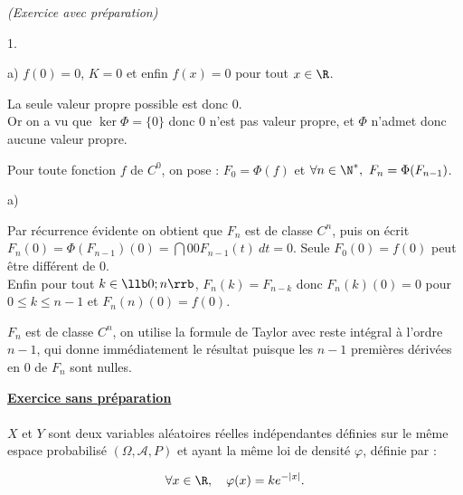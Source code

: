 \documentclass[11pt]{article}%
\begin{document}
\begin{exercice}{\it (Exercice avec préparation)}
\begin{noliste}{1.}
\begin{noliste}{a)}
$f(0) = 0$, $K = 0$ et enfin $f(x) = 0$ pour tout $x \in \R$. \\
 \item La seule valeur propre possible est donc 0. \\
 Or on a vu que $\ker \Phi = \{ 0 \}$ donc $0$ n'est pas valeur propre,
et $\Phi$ n'admet donc aucune valeur propre. \\
 \end{noliste}
 \item Pour toute fonction $f$ de $C^{0}$, on pose : $F_{0} = \Phi(f)$
et $\forall n \in \N^*,\ F_{n} = \Phi ( F_{n-1} )$. \begin{noliste}{a)}
 \setlength{\itemsep}{2mm}
 \item Par récurrence évidente on obtient que $F_{n}$ est de classe
$C^{n}$, puis on écrit $F_{n} ( 0) = \Phi (F_{n-1} ) (0) = \dint{0}{0}
F_{n-1} (t)\ dt = 0$. Seule $F_{0} (0) = f(0)$ peut être différent de
0. \\
 Enfin pour tout $k \in \llb 0 ; n \rrb$, $F_{n}{(k)} = F_{n-k}$ donc
$F_{n}{(k)} (0) = 0$ pour $0 \leq k \leq n-1$ et $F_{n}{(n)} (0) =
f(0)$. \\
 \item $F_{n}$ est de classe $C^{n}$, on utilise la formule de Taylor
avec reste intégral à l'ordre $n-1$, qui donne immédiatement le
résultat puisque les $n-1$ premières dérivées en 0 de $F_{n}$ sont
nulles. \\
 \end{noliste}
 \end{noliste}
 \noindent \textbf{\underline{Exercice sans préparation}} \\
\\
 $X$ et $Y$ sont deux variables aléatoires réelles indépendantes
définies sur le même espace probabilisé $(\Omega, \mathcal{A}, P)$ et
ayant la même loi de densité $\varphi$, définie par :
 
\[
 \forall x \in \R,\ \ \ \varphi(x) = k e^{ - | x |}.
 
\]
\end{exercice}
\end{document}
